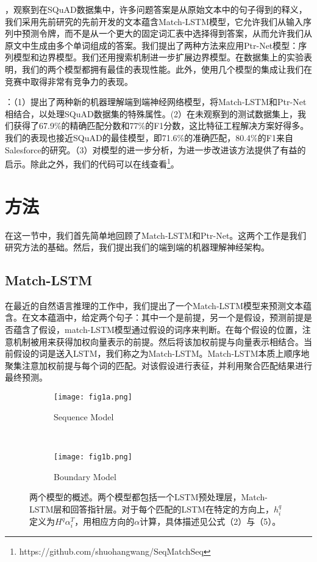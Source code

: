 \documentclass{article}
\begin{document}
\begin{CJK*}{UTF8}{gbsn}
        \vspace{1ex}        
        ，观察到在SQuAD数据集中，许多问题答案是从原始文本中的句子得到的释义，我们采用先前研究的先前开发的文本蕴含Match-LSTM模型，它允许我们从输入序列中预测令牌，而不是从一个更大的固定词汇表中选择得到答案，从而允许我们从原文中生成由多个单词组成的答案。我们提出了两种方法来应用Ptr-Net模型：序列模型和边界模型。我们还用搜索机制进一步扩展边界模型。在数据集上的实验表明，我们的两个模型都拥有最佳的表现性能。此外，使用几个模型的集成让我们在竞赛中取得非常有竞争力的表现。

        \vspace{1ex}        
        ：（1）提出了两种新的机器理解端到端神经网络模型，将Match-LSTM和Ptr-Net相结合，以处理SQuAD数据集的特殊属性。(2）在未观察到的测试数据集上，我们获得了67.9\%的精确匹配分数和77\%的F1分数，这比特征工程解决方案好得多。我们的表现也接近SQuAD的最佳模型，即71.6\%的准确匹配，80.4\%的F1来自Salesforce的研究。（3）对模型的进一步分析，为进一步改进该方法提供了有益的启示。除此之外，我们的代码可以在线查看\footnote{https://github.com/shuohangwang/SeqMatchSeq}。
        
    \section{方法}
    在这一节中，我们首先简单地回顾了Match-LSTM和Ptr-Net。这两个工作是我们研究方法的基础。然后，我们提出我们的端到端的机器理解神经架构。
    \subsection{Match-LSTM}
    在最近的自然语言推理的工作中，我们提出了一个Match-LSTM模型来预测文本蕴含。在文本蕴涵中，给定两个句子：其中一个是前提，另一个是假设，预测前提是否蕴含了假设，match-LSTM模型通过假设的词序来判断。在每个假设的位置，注意机制被用来获得加权向量表示的前提。然后将该加权前提与向量表示相结合。当前假设的词是送入LSTM，我们称之为Match-LSTM。Match-LSTM本质上顺序地聚集注意加权前提与每个词的匹配。对该假设进行表征，并利用聚合匹配结果进行最终预测。


    \begin{figure*}[!thbp]
    \centering
        \begin{subfigure}[t]{0.5\textwidth}
            \centering
            \texttt{[image: fig1a.png]}
            \caption{Sequence Model}
        \end{subfigure}%
    ~ 
        \vspace{1ex}
        \begin{subfigure}[t]{0.5\textwidth}
        \centering
        \texttt{[image: fig1b.png]}
        \caption{Boundary Model}
        \end{subfigure}
    \caption{两个模型的概述。两个模型都包括一个LSTM预处理层，Match-LSTM层和回答指针层。对于每个匹配的LSTM在特定的方向上，$h^{q}_{i}$定义为${H^{q}\alpha_{i}^{T}}$，用相应方向的$\alpha$计算，具体描述见公式（2）与（5）。}
    

\end{figure*}
\end{CJK*}
\end{document}
